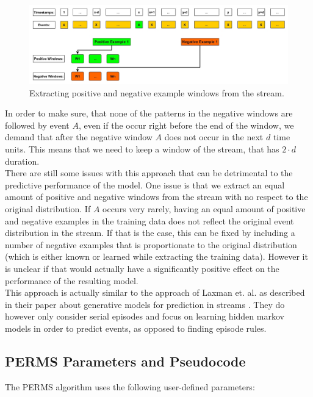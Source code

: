 \begin{figure}[h]
	\centering
  	\includegraphics[width=\textwidth]{trainingDataPositiveAndNegativeWindows}
	\caption{Extracting positive and negative example windows from the stream.}
	\label{fig_trainingDataPositiveAndNegativeWindows}
\end{figure}

In order to make sure, that none of the patterns in the negative windows are followed by event $A$, even if the occur right before the end of the window, we demand that after the negative window $A$ does not occur in the next $d$ time units. This means that we need to keep a window of the stream, that has $2\cdot d$ duration.\\
There are still some issues with this approach that can be detrimental to the predictive performance of the model. One issue is that we extract an equal amount of positive and negative windows from the stream with no respect to the original distribution. If $A$ occurs very rarely, having an equal amount of positive and negative examples in the training data does not reflect the original event distribution in the stream. If that is the case, this can be fixed by including a number of negative examples that is proportionate to the original distribution (which is either known or learned while extracting the training data). However it is unclear if that would actually have a significantly positive effect on the performance of the resulting model. \\
This approach is actually similar to the approach of Laxman et. al. as described in their paper about generative models for prediction in streams \cite{laxman2008stream}. They do however only consider serial episodes and focus on learning hidden markov models in order to predict events, as opposed to finding episode rules.

\subsection{PERMS Parameters and Pseudocode}
\label{subsec_perms}

The PERMS algorithm uses the following user-defined parameters:


